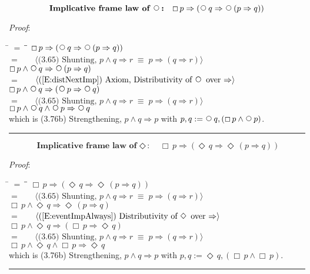 \documentclass[12pt, fleqn, leqno]{article}
\newcommand{\lgap}{2pt}                             %
\newcommand{\mymathindent}{24pt}                    %
\newcommand{\equivs}{\ensuremath{\;\equiv\;}}       %
\newcommand{\impl}{\ensuremath{\Rightarrow}}        %
\newcommand{\Next}{\;\,\text{\raisebox{3.5pt}{\circle{6}}}}
\newcommand{\Event}{\Diamond\,}
\newcommand{\Always}{\Box\,}
\newcommand{\myqed}{\rule[-.23ex]{1.2ex}{2.0ex}}
\newcommand{\myqedtab}{\hspace{384pt}}              %
\newcommand{\Gll} {\langle}                         %
\newcommand{\Ggg} {\rangle}                         %
\newcommand{\Hint}[1]     {\ \ \ $\Gll              \mbox{#1} \Ggg$ }   %
\begin{document}
\begin{equation}\label{E:implframelawnext}
\textbf{Implicative frame law of $\Next$:}\quad \Always p \impl (\Next q \impl \Next (p \impl q))
\end{equation}

\emph{Proof}: 
\begin{tabbing}
\hspace{\mymathindent} \= $= \;$ \= \myqedtab \= \kill
  \> \>   $\Always p \impl (\Next q \impl \Next (p \impl q))$\\[\lgap]
  \> $=$  \>  \Hint{(3.65) Shunting, $p\land q\impl r\equivs p\impl (q\impl r)$}\\[\lgap]
  \> \>   $\Always p \land \Next q \impl \Next (p \impl q)$\\[\lgap]
  \> $=$  \>  \Hint{(\ref{E:distNextImp}) Axiom, Distributivity of $\Next$ over $\impl$}\\[\lgap]
  \> \>   $\Always p \land \Next q \impl  (\Next p \impl \Next q)$\\[\lgap]
   \> $=$  \>  \Hint{(3.65) Shunting, $p\land q\impl r\equivs p\impl (q\impl r)$}\\[\lgap]
  \> \>   $\Always p \land \Next q  \land \Next p \impl \Next q$\\[\lgap]
   \> which is (3.76b) Strengthening, $p\land q \impl p$ with $p, q :=\Next q ,(\Always p \land \Next p)$. \quad \myqed
\end{tabbing}

\begin{equation}\label{E:implframelawEvent}
\textbf{Implicative frame law of $\Event$:}\quad \Always p \impl (\Event q \impl \Event (p \impl q))
\end{equation}

\emph{Proof}: 
\begin{tabbing}
\hspace{\mymathindent} \= $= \;$ \= \myqedtab \= \kill
  \> \>   $\Always p \impl (\Event q \impl \Event (p \impl q))$\\[\lgap]
  \> $=$  \>  \Hint{(3.65) Shunting, $p\land q\impl r\equivs p\impl (q\impl r)$}\\[\lgap]
  \> \>   $\Always p \land \Event q \impl \Event (p \impl q)$\\[\lgap]
  \> $=$  \>  \Hint{(\ref{E:eventImpAlways}) Distributivity of $\Event$ over $\impl$}\\[\lgap]
  \> \>   $\Always p \land \Event q \impl  (\Always p \impl \Event q)$\\[\lgap]
   \> $=$  \>  \Hint{(3.65) Shunting, $p\land q\impl r\equivs p\impl (q\impl r)$}\\[\lgap]
  \> \>   $\Always p \land \Event q  \land \Always p \impl \Event q$\\[\lgap]
   \> which is (3.76b) Strengthening, $p\land q \impl p$ with $p, q :=\Event q ,(\Always p \land \Always p)$. \quad \myqed
\end{tabbing}
\end{document}
